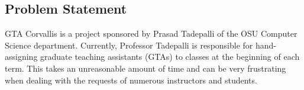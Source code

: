 \subsection{Problem Statement}

GTA Corvallis is a project sponsored by Prasad Tadepalli of the OSU Computer Science department. Currently, Professor Tadepalli is responsible for hand-assigning graduate teaching assistants (GTAs) to classes at the beginning of each term. This takes an unreasonable amount of time and can be very frustrating when dealing with the requests of numerous instructors and students. 
